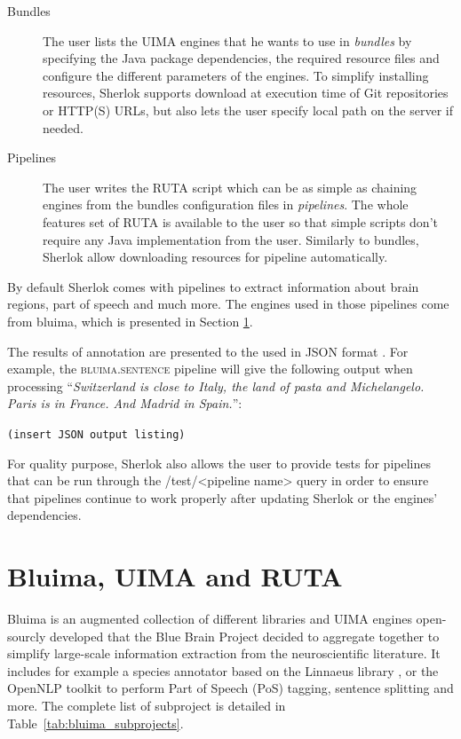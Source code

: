\documentclass{article}
\newcommand{\ID}[1]{{\textsc{#1}}}
\newcommand{\TODO}[1]{\texttt{\textcolor{YellowOrange}{(#1)}}} %
\newcommand{\REST}[1]{\textsf{#1}}
\begin{document}
\begin{description}
    \item[Bundles] The user lists the UIMA engines that he wants to use in \emph{bundles} by specifying
        the Java package dependencies, the required resource files and configure the different
        parameters of the engines. To simplify installing resources, Sherlok supports download at
        execution time of Git repositories or HTTP(S) URLs, but also lets the user specify local
        path on the server if needed.
    \item[Pipelines] The user writes the RUTA script which can be as simple as chaining engines from
        the bundles configuration files in \emph{pipelines}. The whole features set of RUTA is
        available to the user so that simple scripts don't require any Java implementation from the
        user. Similarly to bundles, Sherlok allow downloading resources for pipeline automatically.
\end{description}

By default Sherlok comes with pipelines to extract information about brain regions, part of speech
and much more. The engines used in those pipelines come from bluima, which is presented in Section
\ref{sec:bluima}.

The results of annotation are presented to the used in JSON format \cite{json}. For example, the
\ID{bluima.sentence} pipeline will give the following output when processing ``\textit{Switzerland
is close to Italy, the land of pasta and Michelangelo. Paris is in France. And Madrid in Spain.}'':

\TODO{insert JSON output listing}

For quality purpose, Sherlok also allows the user to provide tests for pipelines that can be run
through the \REST{/test/<pipeline name>} query in order to ensure that pipelines continue to work
properly after updating Sherlok or the engines' dependencies.

\section{Bluima, UIMA and RUTA}
\label{sec:bluima}

Bluima is an augmented collection of different libraries and UIMA \cite{uima} engines open-sourcly
developed that the Blue Brain Project \cite{bbp} decided to aggregate together to simplify
large-scale information extraction from the neuroscientific literature. It includes for example a
species annotator based on the Linnaeus library \cite{linnaeus}, or the OpenNLP toolkit
\cite{opennlp} to perform Part of Speech (PoS) tagging, sentence splitting and more. The complete
list of subproject is detailed in Table~\ref{tab:bluima_subprojects}.
\end{document}
